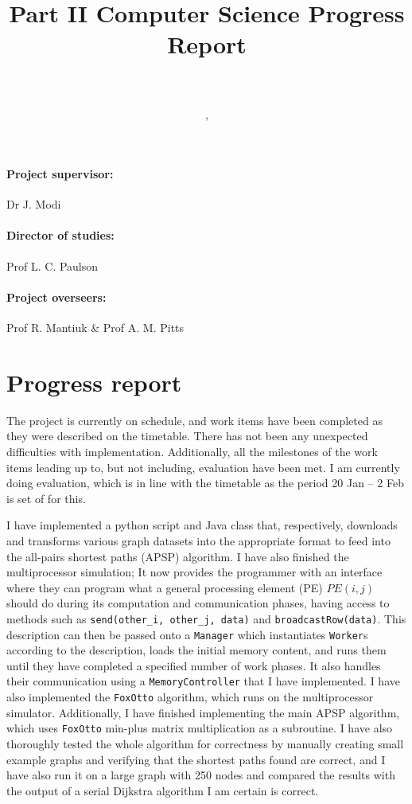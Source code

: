 \documentclass[11pt]{article}
\title{
    {\large Part II Computer Science Progress Report} \\~\\
    \dissertationtitle}
\author{
    \authorname, \authorcollege \\
    \texttt{\authoremail}
}
\begin{document}
\maketitle

\paragraph{Project supervisor:}%
\label{par:Project Supervisor}
Dr J. Modi

\paragraph{Director of studies:}%
\label{par:Director of Studies:}
Prof L. C. Paulson

\paragraph{Project overseers:}%
\label{par:Project Overseers:}
Prof R. Mantiuk \& Prof A. M. Pitts

\newpage

\section*{Progress report}

The project is currently on schedule, and work items have been completed as
they were described on the timetable. There has not been any unexpected
difficulties with implementation. Additionally, all the milestones of the work
items leading up to, but not including, evaluation have been met. I am
currently doing evaluation, which is in line with the timetable as the period
20 Jan -- 2 Feb is set of for this.

I have implemented a python script and Java class that, respectively, downloads
and transforms various graph datasets into the appropriate format to feed into
the all-pairs shortest paths (APSP) algorithm.  I have also finished the
multiprocessor simulation; It now provides the programmer with an interface
where they can program what a general processing element (PE) $PE(i, j)$ should
do during its computation and communication phases, having access to methods
such as \verb|send(other_i, other_j, data)| and \verb|broadcastRow(data)|. This
description can then be passed onto a \texttt{Manager} which instantiates
\texttt{Worker}s according to the description, loads the initial memory
content, and runs them until they have completed a specified number of work
phases.  It also handles their communication using a \texttt{MemoryController}
that I have implemented.  I have also implemented the \texttt{FoxOtto}
algorithm, which runs on the multiprocessor simulator.  Additionally, I have
finished implementing the main APSP algorithm, which uses \texttt{FoxOtto}
min-plus matrix multiplication as a subroutine.  I have also thoroughly tested
the whole algorithm for correctness by manually creating small example graphs
and verifying that the shortest paths found are correct, and I have also run it
on a large graph with 250 nodes and compared the results with the output of a
serial Dijkstra algorithm I am certain is correct.
\end{document}

